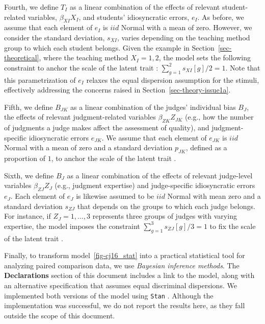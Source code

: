 \documentclass[
  authoryear,
  review,
  1p]{elsarticle}
\begin{document}
Fourth, we define \(T_{I}\) as a linear combination of the effects of
relevant student-related variables, \(\beta_{XI} X_{I}\), and students'
idiosyncratic errors, \(e_{I}\). As before, we assume that each element
of \(e_{I}\) is \(iid\) Normal with a mean of zero. However, we consider
the standard deviation, \(s_{XI}\), varies depending on the teaching
method group to which each student belongs. Given the example in
Section~\ref{sec-theoretical}, where the teaching method
\(X_{I} = 1,2\), the model sets the following constraint to anchor the
scale of the latent trait \citep{Depaoli_2021}:
\(\sum_{g=1}^{2} s_{XI}[g]/2 = 1\). Note that this parametrization of
\(e_{I}\) relaxes the equal dispersion assumption for the stimuli,
effectively addressing the concerns raised in
Section~\ref{sec-theory-issue1a}.

Fifth, we define \(B_{JK}\) as a linear combination of the judges'
individual bias \(B_{J}\), the effects of relevant judgment-related
variables \(\beta_{ZK}Z_{JK}\) (e.g., how the number of judgments a
judge makes affect the assessment of quality), and judgment-specific
idiosyncratic errors \(e_{JK}\). We assume that each element of
\(e_{JK}\) is \(iid\) Normal with a mean of zero and a standard
deviation \(p_{JK}\), defined as a proportion of \(1\), to anchor the
scale of the latent trait \citep{Depaoli_2021}.

Sixth, we define \(B_{J}\) as a linear combination of the effects of
relevant judge-level variables \(\beta_{ZJ}Z_{J}\) (e.g., judgment
expertise) and judge-specific idiosyncratic errors \(e_{J}\). Each
element of \(e_{J}\) is likewise assumed to be \(iid\) Normal with mean
zero and a standard deviation \(s_{ZJ}\) that depends on the groups to
which each judge belongs. For instance, if \(Z_{J} = 1, \dots, 3\)
represents three groups of judges with varying expertise, the model
imposes the constraint \(\sum_{g=1}^{3} s_{ZJ}[g]/3 = 1\) to fix the
scale of the latent trait \citep{Depaoli_2021}.

Finally, to transform model~\ref{fig-cj16_stat} into a practical
statistical tool for analyzing paired comparison data, we use
\emph{Bayesian inference methods}. The \textbf{Declarations} section of
this document includes a link to the model, along with an alternative
specification that assumes equal discriminal dispersions. We implemented
both versions of the model using \texttt{Stan} \citep[version
\(2.26.1\),][]{Stan_2020}. Although the implementation was successful,
we do not report the results here, as they fall outside the scope of
this document.
\end{document}
